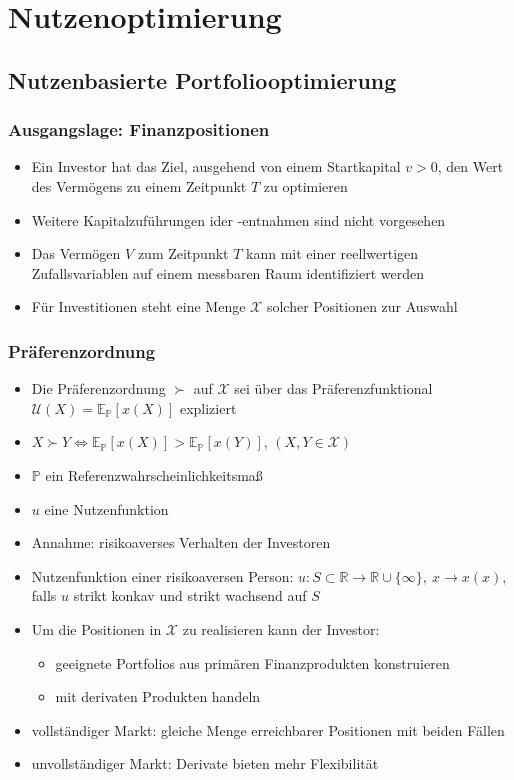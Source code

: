 \documentclass[12pt]{report}
\theoremstyle{dotless}
\theoremstyle{definition}
\begin{document}
\section{Nutzenoptimierung}

\subsection{Nutzenbasierte Portfoliooptimierung}

\subsubsection{Ausgangslage: Finanzpositionen}
\begin{itemize}
	\item Ein Investor hat das Ziel, ausgehend von einem Startkapital $v>0$, den Wert des Verm\"ogens zu einem Zeitpunkt $T$ zu optimieren
	\item Weitere Kapitalzuf\"uhrungen ider -entnahmen sind nicht vorgesehen
	\item Das Verm\"ogen $V$ zum Zeitpunkt $T$ kann mit einer reellwertigen Zufallsvariablen auf einem messbaren Raum identifiziert werden
	\item F\"ur Investitionen steht eine Menge $\mathcal{X}$ solcher Positionen zur Auswahl
\end{itemize}

\subsubsection{Pr\"aferenzordnung}

\begin{itemize}
	\item Die Pr\"aferenzordnung $\succ$ auf $\mathcal{X}$ sei \"uber das Pr\"aferenzfunktional $\mathcal{U}(X) = \mathbb{E_P}[x(X)]$ expliziert
	\item $X \succ Y \Leftrightarrow \mathbb{E_P}[x(X)] > \mathbb{E_P}[x(Y)]$, $(X,Y \in \mathcal{X})$
	\item $\mathbb{P}$ ein Referenzwahrscheinlichkeitsma{\ss}
	\item $u$ eine Nutzenfunktion
	\item Annahme: risikoaverses Verhalten der Investoren
	\item Nutzenfunktion einer risikoaversen Person: $u:S \subset \mathbb{R} \rightarrow \mathbb{R} \cup \{\infty\}, \ x \rightarrow x(x)$, falls $u$ strikt konkav und strikt wachsend auf $S$
	\item Um die Positionen in $\mathcal{X}$ zu realisieren kann der Investor:
	\begin{itemize}
		\item geeignete Portfolios aus prim\"aren Finanzprodukten konstruieren
		\item mit derivaten Produkten handeln
	\end{itemize}
	\item vollst\"andiger Markt: gleiche Menge erreichbarer Positionen mit beiden F\"allen
	\item unvollst\"andiger Markt: Derivate bieten mehr Flexibilit\"at
\end{itemize}
\end{document}

